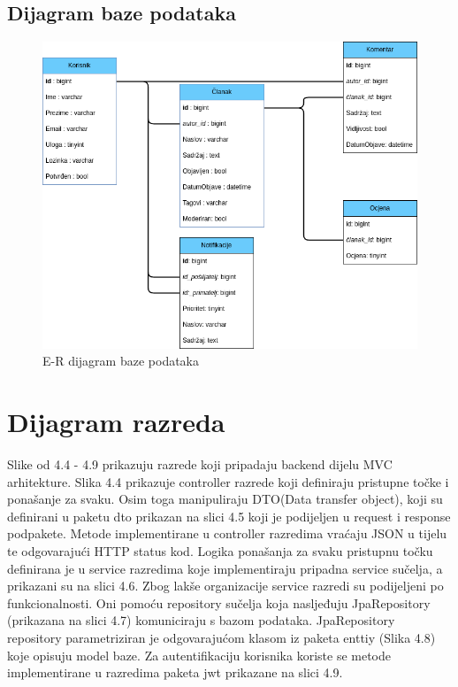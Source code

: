 				
			
			\subsection{Dijagram baze podataka}
					\begin{figure}[H]
					\includegraphics[scale=0.5]{slike/baza.png}
					\centering
					\caption{E-R dijagram baze podataka}
					\label{fig:baza}
				\end{figure}
		
			\eject
			
			
		\section{Dijagram razreda}
		
			Slike od 4.4 - 4.9 prikazuju razrede koji pripadaju backend dijelu MVC arhitekture. Slika 4.4 prikazuje controller razrede koji definiraju pristupne točke i ponašanje za svaku. 
			Osim toga manipuliraju DTO(Data transfer object), koji su definirani u paketu dto prikazan na slici 4.5 koji je podijeljen u request i response podpakete. 
			Metode implementirane u controller razredima vraćaju JSON u tijelu te odgovarajući HTTP status kod. 
			Logika ponašanja za svaku pristupnu točku definirana je u service razredima koje implementiraju pripadna service sučelja, a prikazani su na slici 4.6. 
			Zbog lakše organizacije service razredi su podijeljeni po funkcionalnosti. Oni pomoću repository sučelja koja nasljeđuju JpaRepository (prikazana na slici 4.7) komuniciraju s bazom podataka.  
			JpaRepository repository parametriziran je odgovarajućom klasom iz paketa enttiy (Slika 4.8) koje opisuju model baze. Za autentifikaciju korisnika koriste se metode implementirane u razredima paketa jwt prikazane na slici 4.9.
			
